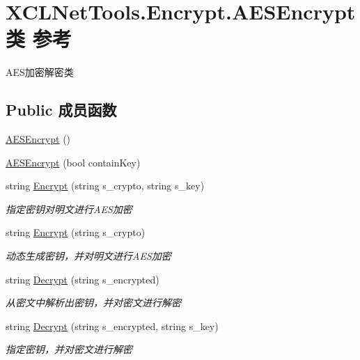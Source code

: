 \hypertarget{class_x_c_l_net_tools_1_1_encrypt_1_1_a_e_s_encrypt}{\section{X\-C\-L\-Net\-Tools.\-Encrypt.\-A\-E\-S\-Encrypt类 参考}
\label{class_x_c_l_net_tools_1_1_encrypt_1_1_a_e_s_encrypt}
}


A\-E\-S加密解密类  


\subsection*{Public 成员函数}
\begin{DoxyCompactItemize}
\item 
\hyperlink{class_x_c_l_net_tools_1_1_encrypt_1_1_a_e_s_encrypt_a5fb828cbf3cf36b59138650043c2a559}{A\-E\-S\-Encrypt} ()
\item 
\hyperlink{class_x_c_l_net_tools_1_1_encrypt_1_1_a_e_s_encrypt_a1c8a3b1284f7846bae3a273cc1ccc055}{A\-E\-S\-Encrypt} (bool contain\-Key)
\item 
string \hyperlink{class_x_c_l_net_tools_1_1_encrypt_1_1_a_e_s_encrypt_af5664c832b91bec53e4f5ede0ac04afb}{Encrypt} (string s\-\_\-crypto, string s\-\_\-key)
\begin{DoxyCompactList}\small\item\em 指定密钥对明文进行\-A\-E\-S加密 \end{DoxyCompactList}\item 
string \hyperlink{class_x_c_l_net_tools_1_1_encrypt_1_1_a_e_s_encrypt_a7c3fb0d592414659abd08468847c374f}{Encrypt} (string s\-\_\-crypto)
\begin{DoxyCompactList}\small\item\em 动态生成密钥，并对明文进行\-A\-E\-S加密 \end{DoxyCompactList}\item 
string \hyperlink{class_x_c_l_net_tools_1_1_encrypt_1_1_a_e_s_encrypt_ac8c024479b061e0d7d1a83308a2cbe99}{Decrypt} (string s\-\_\-encrypted)
\begin{DoxyCompactList}\small\item\em 从密文中解析出密钥，并对密文进行解密 \end{DoxyCompactList}\item 
string \hyperlink{class_x_c_l_net_tools_1_1_encrypt_1_1_a_e_s_encrypt_ab7e79827a218ac4ac89893b1fde2df4c}{Decrypt} (string s\-\_\-encrypted, string s\-\_\-key)
\begin{DoxyCompactList}\small\item\em 指定密钥，并对密文进行解密 \end{DoxyCompactList}\end{DoxyCompactItemize}
